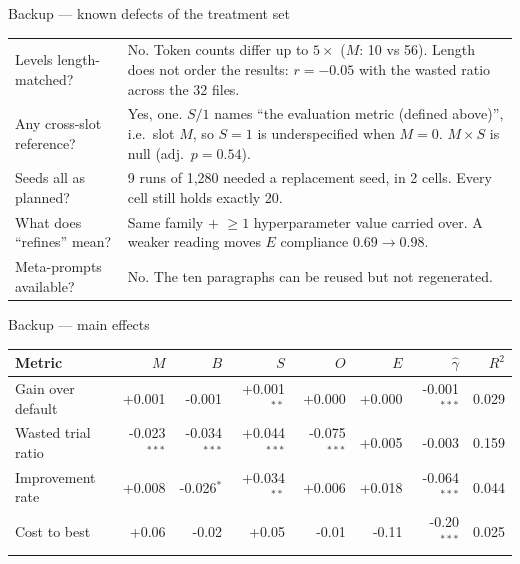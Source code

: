\documentclass[aspectratio=169,11pt]{beamer}
\begin{document}
\begin{frame}{Backup --- known defects of the treatment set}
\footnotesize
\begin{tabular}{@{}p{3.9cm}p{8.1cm}@{}}
\toprule
Levels length-matched? & No. Token counts differ up to $5\times$ ($M$: 10 vs 56). Length does not order the results: $r=-0.05$ with the wasted ratio across the 32 files.\\
Any cross-slot reference? & Yes, one. $S/1$ names ``the evaluation metric (defined above)'', i.e.\ slot $M$, so $S=1$ is underspecified when $M=0$. $M\times S$ is null (adj.\ $p=0.54$).\\
Seeds all as planned? & 9 runs of 1{,}280 needed a replacement seed, in 2 cells. Every cell still holds exactly 20.\\
What does ``refines'' mean? & Same family $+$ $\ge 1$ hyperparameter value carried over. A weaker reading moves $E$ compliance $0.69 \to 0.98$.\\
Meta-prompts available? & No. The ten paragraphs can be reused but not regenerated.\\
\bottomrule
\end{tabular}
\end{frame}

\begin{frame}{Backup --- main effects}
\centering\footnotesize
\setlength{\tabcolsep}{4pt}
\begin{tabular}{@{}lrrrrrrr@{}}
\toprule
Metric & $M$ & $B$ & $S$ & $O$ & $E$ & $\hat\gamma$ & $R^2$\\
\midrule
Gain over default   & +0.001 & -0.001 & +0.001$^{**}$ & +0.000 & +0.000 & -0.001$^{***}$ & 0.029 \\
Wasted trial ratio  & -0.023$^{***}$ & -0.034$^{***}$ & +0.044$^{***}$ & -0.075$^{***}$ & +0.005 & -0.003 & 0.159 \\
Improvement rate    & +0.008 & -0.026$^{*}$ & +0.034$^{**}$ & +0.006 & +0.018 & -0.064$^{***}$ & 0.044 \\
Cost to best        & +0.06 & -0.02 & +0.05 & -0.01 & -0.11 & -0.20$^{***}$ & 0.025 \\
\bottomrule
\end{tabular}
\end{frame}
\end{document}

